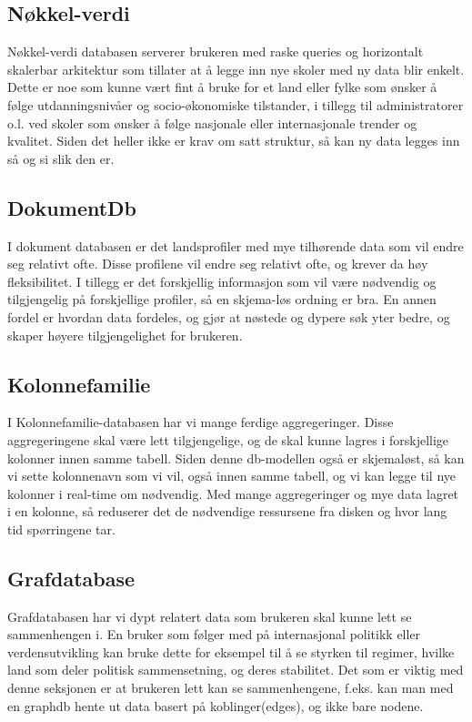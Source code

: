 \subsection{Nøkkel-verdi}
Nøkkel-verdi databasen serverer brukeren med raske queries og horizontalt skalerbar arkitektur som tillater at å legge inn nye skoler med ny data blir enkelt. Dette er noe som kunne vært fint å bruke for et land eller fylke som ønsker å følge utdanningsnivåer og socio-økonomiske tilstander, i tillegg til administratorer o.l. ved skoler som ønsker å følge nasjonale eller internasjonale trender og kvalitet. Siden det heller ikke er krav om satt struktur, så kan ny data legges inn så og si slik den er.

\subsection{DokumentDb}
I dokument databasen er det landsprofiler med mye tilhørende data som vil endre seg relativt ofte. Disse profilene vil endre seg relativt ofte, og krever da høy fleksibilitet. I tillegg er det forskjellig informasjon som vil være nødvendig og tilgjengelig på forskjellige profiler, så en skjema-løs ordning er bra. En annen fordel er hvordan data fordeles, og gjør at nøstede og dypere søk yter bedre, og skaper høyere tilgjengelighet for brukeren.

\subsection{Kolonnefamilie}
I Kolonnefamilie-databasen har vi mange ferdige aggregeringer. Disse aggregeringene skal være lett tilgjengelige, og de skal kunne lagres i forskjellige kolonner innen samme tabell. Siden denne db-modellen også er skjemaløst, så kan vi sette kolonnenavn som vi vil, også innen samme tabell, og vi kan legge til nye kolonner i real-time om nødvendig. Med mange aggregeringer og mye data lagret i en kolonne, så reduserer det de nødvendige ressursene fra disken og hvor lang tid spørringene tar.

\subsection{Grafdatabase}
Grafdatabasen har vi dypt relatert data som brukeren skal kunne lett se sammenhengen i. En bruker som følger med på internasjonal politikk eller verdensutvikling kan bruke dette for eksempel til å se styrken til regimer, hvilke land som deler politisk sammensetning, og deres stabilitet. Det som er viktig med denne seksjonen er at brukeren lett kan se sammenhengene, f.eks. kan man med en graphdb hente ut data basert på koblinger(edges), og ikke bare nodene.